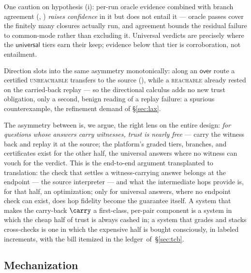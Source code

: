 One caution on hypothesis (i): per-run oracle evidence combined with
branch agreement (, ) \emph{raises
confidence} in it but does not entail it --- oracle passes cover the
finitely many closures actually run, and agreement bounds the residual
failure to common-mode rather than excluding it. Universal verdicts are
precisely where the $\mathsf{universal}$ tiers earn their keep; evidence
below that tier is corroboration, not entailment.

Direction slots into the same asymmetry monotonically: along an
$\mathsf{over}$ route a certified \textsc{unreachable} transfers to the
source (), while a \textsc{reachable} already rested on
the carried-back replay --- so the directional calculus adds no new
trust obligation, only a second, benign reading of a replay failure:
a spurious counterexample, the refinement demand of \S\ref{sec:lax}.

The asymmetry between  is, we argue,
the right lens on the entire design: \emph{for questions whose answers
carry witnesses, trust is nearly free} --- carry the witness back and
replay it at the source; the platform's graded tiers, branches, and
certificates exist for the other half, the universal answers where no
witness can vouch for the verdict. This is the end-to-end argument
\citep{saltzer1984endtoend} transplanted to translation: the check that
settles a witness-carrying answer belongs at the endpoint --- the
source interpreter --- and what the intermediate hops provide is, for
that half, an optimization; only for universal answers, where no
endpoint check can exist, does hop fidelity become the guarantee
itself. A system that makes the carry-back
$\carry$ a first-class, per-pair component is a system in which the cheap
half of trust is always cashed in; a system that grades and stacks
cross-checks is one in which the expensive half is bought consciously,
in labeled increments, with the bill itemized in the
ledger~of~\S\ref{sec:tcb}.

\subsection{Mechanization}
\label{sec:mech}

